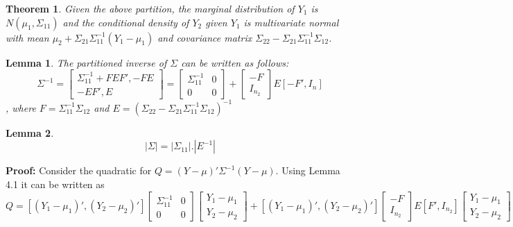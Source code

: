 \documentclass{article}
\newtheorem{theorem}{Theorem}[section]
\newtheorem{lemma}{Lemma}[section]
\begin{document}
\begin{theorem}
    Given the above partition, the marginal distribution of \(Y_1\) is \(N(\mu_1,\Sigma_{11})\) and the conditional density of \(Y_2\) given \(Y_1\) is multivariate normal with mean \(\mu_2+\Sigma_{21}\Sigma_{11}^{-1}(Y_1-\mu_1)\) and covariance matrix \(\Sigma_{22}-\Sigma_{21}\Sigma_{11}^{-1}\Sigma_{12}\).
\end{theorem}

\begin{lemma}
    The partitioned inverse of \(\Sigma\) can be written as follows:
    \begin{equation*}
        \Sigma^{-1}=\begin{bmatrix}
            \Sigma_{11}^{-1}+FEF',-FE\\
            -EF',E
        \end{bmatrix}
        = \begin{bmatrix}
            \Sigma_{11}^{-1} & 0\\
            0 & 0
        \end{bmatrix}
        + \begin{bmatrix}
            -F\\
            I_{n_2}
        \end{bmatrix}
        E [-F', I_n]
    \end{equation*},
    where \(F=\Sigma_{11}^{-1}\Sigma_{12}\) and \(E=(\Sigma_{22}-\Sigma_{21}\Sigma_{11}^{-1}\Sigma_{12})^{-1}\)
\end{lemma}

\begin{lemma}
    \begin{equation*}
        |\Sigma|=|\Sigma_{11}|.|E^{-1}|
    \end{equation*}
\end{lemma}

\textbf{Proof:} Consider the quadratic for \(Q=(Y-\mu)'\Sigma^{-1}(Y-\mu)\). Using Lemma 4.1 it can be written as
\begin{equation*}
    Q = [(Y_1-\mu_1)',(Y_2-\mu_2)'] \begin{bmatrix}
        \Sigma_{11}^{-1} & 0 \\
        0 & 0 
    \end{bmatrix}
    \begin{bmatrix}
        Y_1-\mu_1\\
        Y_2-\mu_2
    \end{bmatrix}
    + [(Y_1-\mu_1)',(Y_2-\mu_2)'] \begin{bmatrix}
        -F\\
        I_{n_2}
    \end{bmatrix}
    E [F',I_{n_2}] \begin{bmatrix}
        Y_1-\mu_1\\
        Y_2-\mu_2
    \end{bmatrix}
\end{equation*}
\end{document}
